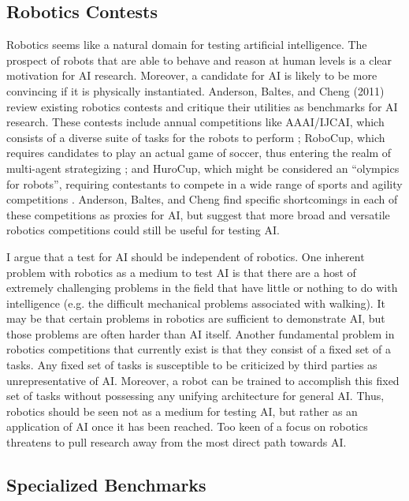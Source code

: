 \subsection{Robotics Contests}

Robotics seems like a natural domain for testing artificial intelligence. The prospect of robots that are able to behave and reason at human levels is a clear motivation for AI research. Moreover, a candidate for AI is likely to be more convincing if it is physically instantiated. Anderson, Baltes, and Cheng (2011) review existing robotics contests and critique their utilities as benchmarks for AI research. These contests include annual competitions like AAAI/IJCAI, which consists of a diverse suite of tasks for the robots to perform \cite{balch2002ten}; RoboCup, which requires candidates to play an actual game of soccer, thus entering the realm of multi-agent strategizing \cite{kitano1997robocup}; and HuroCup, which might be considered an ``olympics for robots'', requiring contestants to compete in a wide range of sports and agility competitions \cite{baltes2009hurocup}. Anderson, Baltes, and Cheng find specific shortcomings in each of these competitions as proxies for AI, but suggest that more broad and versatile robotics competitions could still be useful for testing AI.

I argue that a test for AI should be independent of robotics. One inherent problem with robotics as a medium to test AI is that there are a host of extremely challenging problems in the field that have little or nothing to do with intelligence (e.g. the difficult mechanical problems associated with walking). It may be that certain problems in robotics are sufficient to demonstrate AI, but those problems are often harder than AI itself. Another fundamental problem in robotics competitions that currently exist is that they consist of a fixed set of a tasks. Any fixed set of tasks is susceptible to be criticized by third parties as unrepresentative of AI. Moreover, a robot can be trained to accomplish this fixed set of tasks without possessing any unifying architecture for general AI. Thus, robotics should be seen not as a medium for testing AI, but rather as an application of AI once it has been reached. Too keen of a focus on robotics threatens to pull research away from the most direct path towards AI. 

\subsection{Specialized Benchmarks}

